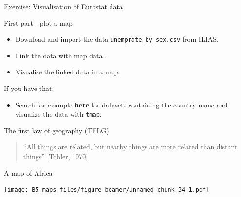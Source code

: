\documentclass[
  10pt,
  ignorenonframetext,
]{beamer}
\newenvironment{Shaded}{\begin{snugshade}}{\end{snugshade}}
\newcommand{\DecValTok}[1]{\textcolor[rgb]{0.86,0.86,0.80}{#1}}
\newcommand{\KeywordTok}[1]{\textcolor[rgb]{0.94,0.87,0.69}{#1}}
\newcommand{\NormalTok}[1]{\textcolor[rgb]{0.80,0.80,0.80}{#1}}
\newcommand{\OperatorTok}[1]{\textcolor[rgb]{0.94,0.94,0.82}{#1}}
\newcommand{\StringTok}[1]{\textcolor[rgb]{0.80,0.58,0.58}{#1}}
\providecommand{\tightlist}{%
  \setlength{\itemsep}{0pt}\setlength{\parskip}{0pt}}
\begin{document}
\begin{frame}[fragile]{Exercise: Visualisation of Eurostat data}
\protect\hypertarget{exercise-visualisation-of-eurostat-data}{}

\begin{block}{First part - plot a map}

\begin{itemize}
\tightlist
\item
  Download and import the data \texttt{unemprate\_by\_sex.csv} from
  ILIAS.
\item
  Link the data with map data .
\item
  Visualise the linked data in a map.
\end{itemize}

\end{block}

\begin{block}{If you have that:}

\begin{itemize}
\tightlist
\item
  Search for example
  \href{https://ec.europa.eu/eurostat/web/euro-indicators}{\textbf{here}}
  for datasets containing the country name and visualize the data with
  \texttt{tmap}.
\end{itemize}

\end{block}

\end{frame}

\begin{frame}{The first law of geography (TFLG)}
\protect\hypertarget{the-first-law-of-geography-tflg}{}

\begin{quote}
``All things are related, but nearby things are more related than
distant things'' {[}Tobler, 1970{]}
\end{quote}

\end{frame}

\begin{frame}[fragile]{A map of Africa}
\protect\hypertarget{a-map-of-africa}{}

\begin{Shaded}
\end{Shaded}

\texttt{[image: B5\_maps\_files/figure-beamer/unnamed-chunk-34-1.pdf]}

\end{frame}
\end{document}
